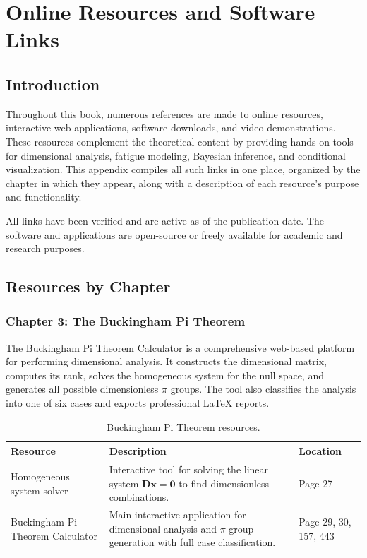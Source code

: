 \startcontents[chapter]
\chapter{Online Resources and Software Links}
\label{ch:links-appendix}
\minitocboxed

\section*{Introduction}

Throughout this book, numerous references are made to online resources, interactive web applications, software downloads, and video demonstrations. These resources complement the theoretical content by providing hands-on tools for dimensional analysis, fatigue modeling, Bayesian inference, and conditional visualization. This appendix compiles all such links in one place, organized by the chapter in which they appear, along with a description of each resource's purpose and functionality.

All links have been verified and are active as of the publication date. The software and applications are open-source or freely available for academic and research purposes.

\section{Resources by Chapter}

\subsection{Chapter 3: The Buckingham Pi Theorem}

The Buckingham Pi Theorem Calculator is a comprehensive web-based platform for performing dimensional analysis. It constructs the dimensional matrix, computes its rank, solves the homogeneous system for the null space, and generates all possible dimensionless $\pi$ groups. The tool also classifies the analysis into one of six cases and exports professional \LaTeX{} reports.

\begin{table}[H]
\centering
\caption{Buckingham Pi Theorem resources.}
\begin{tabular}{p{3cm}p{8cm}p{3cm}}
\toprule
\textbf{Resource} & \textbf{Description} & \textbf{Location} \\
\midrule
Homogeneous system solver & Interactive tool for solving the linear system $\mathbf{D}\mathbf{x}=\mathbf{0}$ to find dimensionless combinations. & Page 27 \\
Buckingham Pi Theorem Calculator & Main interactive application for dimensional analysis and $\pi$-group generation with full case classification. & Page 29, 30, 157, 443 \\
\bottomrule
\end{tabular}
\end{table}

